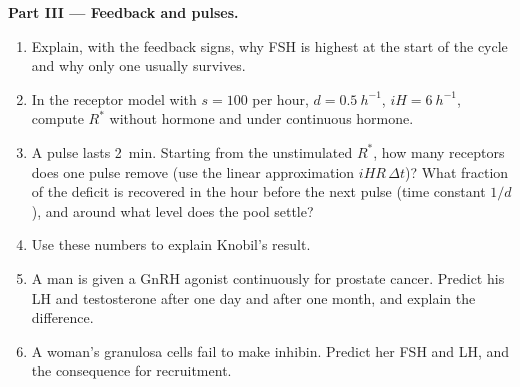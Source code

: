 \begin{problem}
\medskip
\noindent\textbf{Part III --- Feedback and pulses.}
\begin{enumerate}[resume]
  \item Explain, with the feedback signs, why FSH is highest at the
        start of the cycle and why only one  usually
        survives.
  \item In the receptor model with $s = 100$ per hour, $d =
        \qty{0.5}{h^{-1}}$, $iH = \qty{6}{h^{-1}}$, compute $R^*$
        without hormone and under continuous hormone.
  \item A pulse lasts \qty{2}{min}. Starting from the unstimulated
        $R^*$, how many receptors does one pulse remove (use the
        linear approximation $iHR\,\Delta t$)? What fraction of the
        deficit is recovered in the hour before the next pulse
        (time constant $1/d$), and around what level does the pool
        settle?
  \item Use these numbers to explain Knobil's result.
  \item A man is given a GnRH agonist continuously for prostate
        cancer. Predict his LH and testosterone after one day and
        after one month, and explain the difference.
  \item A woman's granulosa cells fail to make inhibin. Predict her
        FSH and LH, and the consequence for  recruitment.
\end{enumerate}


\end{problem}
